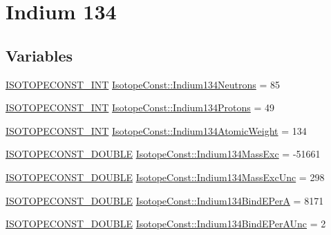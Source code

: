 \hypertarget{group___isotope_const-_indium-_in134}{}\section{Indium 134}
\label{group___isotope_const-_indium-_in134}
\subsection*{Variables}
\begin{DoxyCompactItemize}
\item 
\mbox{\hyperlink{group___isotope_const-_macros_ga5f18360b3e99483a35c32d789e62621c}{I\+S\+O\+T\+O\+P\+E\+C\+O\+N\+S\+T\+\_\+\+I\+NT}} \mbox{\hyperlink{group___isotope_const-_indium-_in134_gae0ddb36c0068dcb00d67b3bc607570a7}{Isotope\+Const\+::\+Indium134\+Neutrons}} = 85
\item 
\mbox{\hyperlink{group___isotope_const-_macros_ga5f18360b3e99483a35c32d789e62621c}{I\+S\+O\+T\+O\+P\+E\+C\+O\+N\+S\+T\+\_\+\+I\+NT}} \mbox{\hyperlink{group___isotope_const-_indium-_in134_ga4205effee2bf2c293d2057f9d66e9bb0}{Isotope\+Const\+::\+Indium134\+Protons}} = 49
\item 
\mbox{\hyperlink{group___isotope_const-_macros_ga5f18360b3e99483a35c32d789e62621c}{I\+S\+O\+T\+O\+P\+E\+C\+O\+N\+S\+T\+\_\+\+I\+NT}} \mbox{\hyperlink{group___isotope_const-_indium-_in134_ga17d4fb0dd73cccdfe206dd7cbe8c1ff8}{Isotope\+Const\+::\+Indium134\+Atomic\+Weight}} = 134
\item 
\mbox{\hyperlink{group___isotope_const-_macros_ga8f45a7272ce02c0b4c65c44636ed719a}{I\+S\+O\+T\+O\+P\+E\+C\+O\+N\+S\+T\+\_\+\+D\+O\+U\+B\+LE}} \mbox{\hyperlink{group___isotope_const-_indium-_in134_ga314ab101ef0affced9cf695f24e58b58}{Isotope\+Const\+::\+Indium134\+Mass\+Exc}} = -\/51661
\item 
\mbox{\hyperlink{group___isotope_const-_macros_ga8f45a7272ce02c0b4c65c44636ed719a}{I\+S\+O\+T\+O\+P\+E\+C\+O\+N\+S\+T\+\_\+\+D\+O\+U\+B\+LE}} \mbox{\hyperlink{group___isotope_const-_indium-_in134_ga3ed612b0eb02683d0c2a69b55e74d331}{Isotope\+Const\+::\+Indium134\+Mass\+Exc\+Unc}} = 298
\item 
\mbox{\hyperlink{group___isotope_const-_macros_ga8f45a7272ce02c0b4c65c44636ed719a}{I\+S\+O\+T\+O\+P\+E\+C\+O\+N\+S\+T\+\_\+\+D\+O\+U\+B\+LE}} \mbox{\hyperlink{group___isotope_const-_indium-_in134_ga32c2bea02b45475d76dfb9ca5b9c2cbc}{Isotope\+Const\+::\+Indium134\+Bind\+E\+PerA}} = 8171
\item 
\mbox{\hyperlink{group___isotope_const-_macros_ga8f45a7272ce02c0b4c65c44636ed719a}{I\+S\+O\+T\+O\+P\+E\+C\+O\+N\+S\+T\+\_\+\+D\+O\+U\+B\+LE}} \mbox{\hyperlink{group___isotope_const-_indium-_in134_gac3781f3f826f5a47e786ccca5c369a87}{Isotope\+Const\+::\+Indium134\+Bind\+E\+Per\+A\+Unc}} = 2

\end{DoxyCompactItemize}
